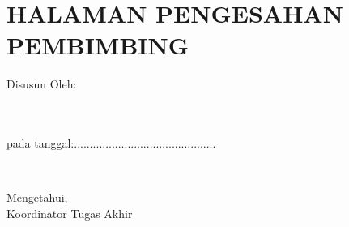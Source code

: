 % 

% 

\chapter*{HALAMAN PENGESAHAN PEMBIMBING}

\vspace*{0.4cm}
\noindent

\noindent
\begin{center}
  \vspace*{2cm}

  Disusun Oleh:\\
  \underline{\penulis}\\
  \nim
  \vspace*{2cm}

  \tipePengesahan\\
  pada tanggal:.............................................\\
  \vspace*{2cm}

  \\
  \vspace*{1cm}

  Mengetahui,\\
  Koordinator Tugas Akhir\\
  \vspace*{1.5cm}
  \underline{\koordinator}\\
  \koordinatornip
\end{center}